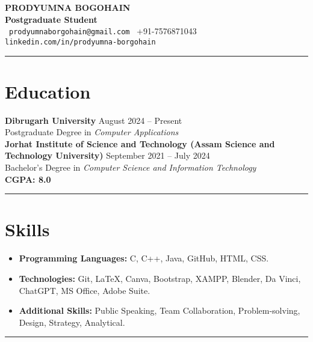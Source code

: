 \documentclass[a4paper,10pt]{article}
\begin{document}
\begin{center}
    {\Huge \textbf{\color{headerblue} PRODYUMNA BOGOHAIN}} \\
    \vspace{1mm}
    \textbf{Postgraduate Student} \\
    \vspace{1mm}
    \small
    \faEnvelope \, \texttt{prodyumnaborgohain@gmail.com} \quad
    \faPhone \, +91-7576871043 \quad
    \faLinkedinSquare \, \texttt{linkedin.com/in/prodyumna-borgohain} \\
\end{center}

\noindent\rule{\textwidth}{0.5pt}
\section*{\color{sectiongray} Education}
\noindent
\textbf{Dibrugarh University} \hfill August 2024 -- Present \\
Postgraduate Degree in\emph{ Computer Applications} \\

\noindent
\textbf{Jorhat Institute of Science and Technology (Assam Science and Technology University)} \hfill September 2021 -- July 2024 \\
Bachelor’s Degree in\emph{ Computer Science and Information Technology} \\
\textbf{CGPA: 8.0}

\noindent\rule{\textwidth}{0.5pt} 
\section*{\color{sectiongray} Skills}
\begin{itemize}[noitemsep]
    \item \textbf{Programming Languages:} C, C++, Java, GitHub, HTML, CSS.
    \item \textbf{Technologies:} Git, LaTeX, Canva, Bootstrap, XAMPP, Blender, Da Vinci, ChatGPT, MS Office, Adobe Suite.
    \item \textbf{Additional Skills:} Public Speaking, Team Collaboration, Problem-solving, Design, Strategy, Analytical.
\end{itemize}

\noindent\rule{\textwidth}{0.5pt} 
\end{document}
